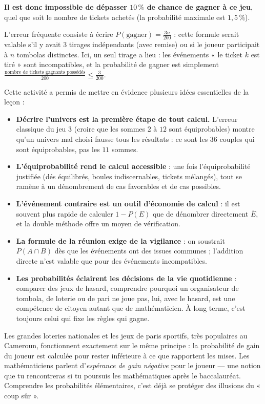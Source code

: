 \documentclass[11pt]{article}
\newcounter{popsec}
\newcounter{popsub}
\newcommand{\courssub}[1]{%
  \stepcounter{popsub}%
  \par\vspace{9pt}\noindent{\popxbold\fontsize{11.5}{13}\selectfont\color{popink}{\color{poporange}\thepopsec.\thepopsub}\hspace{6pt}#1}\par\nopagebreak\vspace{4pt}
}
\begin{document}
\begin{exoresolu}
\textbf{Il est donc impossible de dépasser $10\,\%$ de chance de gagner à ce jeu}, quel que soit le nombre de tickets achetés (la probabilité maximale est $1,5\,\%$). 

L'erreur fréquente consiste à écrire $P(\text{gagner})=\frac{3n}{200}$ : cette formule serait valable s'il y avait $3$ tirages indépendants (avec remise) ou si le joueur participait à $n$ tombolas distinctes. Ici, un seul tirage a lieu : les événements « le ticket $k$ est tiré » sont incompatibles, et la probabilité de gagner est simplement $\frac{\text{nombre de tickets gagnants possédés}}{200} \le \frac{3}{200}$.
\end{exoresolu}

\courssub{Bilan de l'activité}

Cette activité a permis de mettre en évidence plusieurs idées essentielles de la leçon :

\begin{itemize}
\item \textbf{Décrire l'univers est la première étape de tout calcul.} L'erreur classique du jeu 3 (croire que les sommes $2$ à $12$ sont équiprobables) montre qu'un univers mal choisi fausse tous les résultats : ce sont les $36$ couples qui sont équiprobables, pas les $11$ sommes.
\item \textbf{L'équiprobabilité rend le calcul accessible} : une fois l'équiprobabilité justifiée (dés équilibrés, boules indiscernables, tickets mélangés), tout se ramène à un dénombrement de cas favorables et de cas possibles.
\item \textbf{L'événement contraire est un outil d'économie de calcul} : il est souvent plus rapide de calculer $1-P(E)$ que de dénombrer directement $\overline{E}$, et la double méthode offre un moyen de vérification.
\item \textbf{La formule de la réunion exige de la vigilance} : on soustrait $P(A\cap B)$ dès que les événements ont des issues communes ; l'addition directe n'est valable que pour des événements incompatibles.
\item \textbf{Les probabilités éclairent les décisions de la vie quotidienne} : comparer des jeux de hasard, comprendre pourquoi un organisateur de tombola, de loterie ou de pari ne joue pas, lui, avec le hasard, est une compétence de citoyen autant que de mathématicien. À long terme, c'est toujours celui qui fixe les règles qui gagne.
\end{itemize}

\begin{savaistu}
Les grandes loteries nationales et les jeux de paris sportifs, très populaires au Cameroun, fonctionnent exactement sur le même principe : la probabilité de gain du joueur est calculée pour rester inférieure à ce que rapportent les mises. Les mathématiciens parlent d'\emph{espérance de gain négative} pour le joueur — une notion que tu rencontreras si tu poursuis les mathématiques après le baccalauréat. Comprendre les probabilités élémentaires, c'est déjà se protéger des illusions du « coup sûr ».
\end{savaistu}
\end{document}
